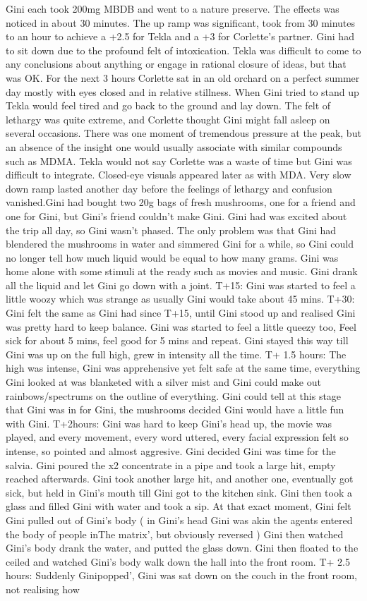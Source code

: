 \documentclass[12pt]{book}
\begin{document}
Gini each took 200mg MBDB and went to a nature preserve. The effects was noticed in about 30 minutes. The up ramp was significant, took from 30 minutes to an hour to achieve a +2.5 for Tekla and a +3 for Corlette's partner. Gini had to sit down due to the profound felt of intoxication. Tekla was difficult to come to any conclusions about anything or engage in rational closure of ideas, but that was OK. For the next 3 hours Corlette sat in an old orchard on a perfect summer day mostly with eyes closed and in relative stillness. When Gini tried to stand up Tekla would feel tired and go back to the ground and lay down. The felt of lethargy was quite extreme, and Corlette thought Gini might fall asleep on several occasions. There was one moment of tremendous pressure at the peak, but an absence of the insight one would usually associate with similar compounds such as MDMA. Tekla would not say Corlette was a waste of time but Gini was difficult to integrate. Closed-eye visuals appeared later as with MDA. Very slow down ramp lasted another day before the feelings of lethargy and confusion vanished.Gini had bought two 20g bags of fresh mushrooms, one for a friend and one for Gini, but Gini's friend couldn't make Gini. Gini had was excited about the trip all day, so Gini wasn't phased. The only problem was that Gini had blendered the mushrooms in water and simmered Gini for a while, so Gini could no longer tell how much liquid would be equal to how many grams. Gini was home alone with some stimuli at the ready such as movies and music. Gini drank all the liquid and let Gini go down with a joint. T+15: Gini was started to feel a little woozy which was strange as usually Gini would take about 45 mins. T+30: Gini felt the same as Gini had since T+15, until Gini stood up and realised Gini was pretty hard to keep balance. Gini was started to feel a little queezy too, Feel sick for about 5 mins, feel good for 5 mins and repeat. Gini stayed this way till Gini was up on the full high, grew in intensity all the time. T+ 1.5 hours: The high was intense, Gini was apprehensive yet felt safe at the same time, everything Gini looked at was blanketed with a silver mist and Gini could make out rainbows/spectrums on the outline of everything. Gini could tell at this stage that Gini was in for Gini, the mushrooms decided Gini would have a little fun with Gini. T+2hours: Gini was hard to keep Gini's head up, the movie was played, and every movement, every word uttered, every facial expression felt so intense, so pointed and almost aggresive. Gini decided Gini was time for the salvia. Gini poured the x2 concentrate in a pipe and took a large hit, empty reached afterwards. Gini took another large hit, and another one, eventually got sick, but held in Gini's mouth till Gini got to the kitchen sink. Gini then took a glass and filled Gini with water and took a sip. At that exact moment, Gini felt Gini pulled out of Gini's body ( in Gini's head Gini was akin the agents entered the body of people inThe matrix', but obviously reversed ) Gini then watched Gini's body drank the water, and putted the glass down. Gini then floated to the ceiled and watched Gini's body walk down the hall into the front room. T+ 2.5 hours: Suddenly Ginipopped', Gini was sat down on the couch in the front room, not realising how 
\end{document}
